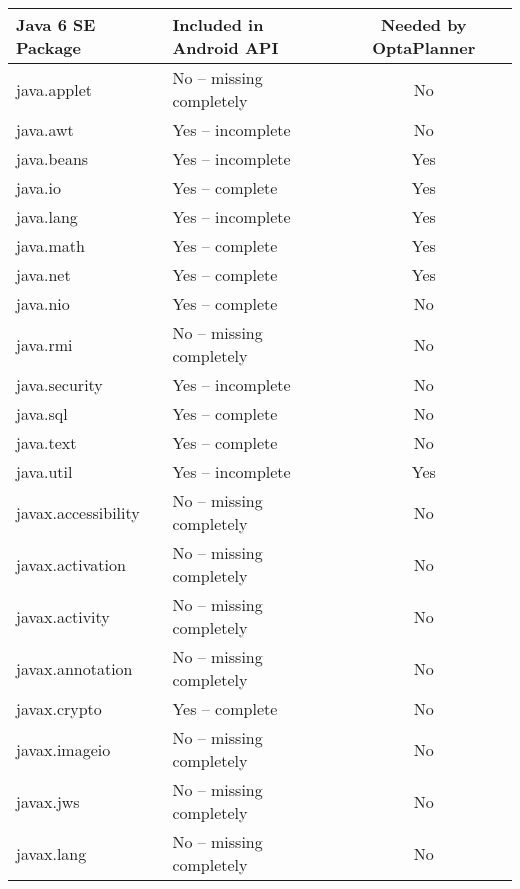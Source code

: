 \begin {table}[h!]
    \begin{tabular}{|l|l|c|}
        \hline
        \textbf{Java 6 SE Package} &
        \textbf{Included in Android API} &
        \textbf{Needed by OptaPlanner} \\ \hline \hline
        java.applet           & No -- missing completely  & No  \\ \hline
        java.awt              & Yes -- incomplete         & No  \\ \hline
        java.beans            & Yes -- incomplete         & Yes \\ \hline
        java.io               & Yes -- complete           & Yes \\ \hline
        java.lang             & Yes -- incomplete         & Yes \\ \hline
        java.math             & Yes -- complete           & Yes \\ \hline
        java.net              & Yes -- complete           & Yes \\ \hline
        java.nio              & Yes -- complete           & No  \\ \hline
        java.rmi              & No -- missing completely  & No  \\ \hline
        java.security         & Yes -- incomplete         & No  \\ \hline
        java.sql              & Yes -- complete           & No  \\ \hline
        java.text             & Yes -- complete           & No  \\ \hline
        java.util             & Yes -- incomplete         & Yes \\ \hline
        javax.accessibility   & No -- missing completely  & No  \\ \hline
        javax.activation      & No -- missing completely  & No  \\ \hline
        javax.activity        & No -- missing completely  & No  \\ \hline
        javax.annotation      & No -- missing completely  & No  \\ \hline
        javax.crypto          & Yes -- complete           & No  \\ \hline
        javax.imageio         & No -- missing completely  & No  \\ \hline
        javax.jws             & No -- missing completely  & No  \\ \hline
        javax.lang            & No -- missing completely  & No  \\ \hline

\end{tabular}
\end{table}
